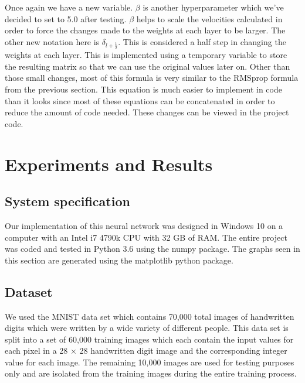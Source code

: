 \documentclass[12pt]{article}
\theoremstyle{definition}
\theoremstyle{plain}
\begin{document}
Once again we have a new variable. $\beta$ is another hyperparameter which we've decided to set to 5.0 after testing. $\beta$ helps to scale the velocities calculated in order to force the changes made to the weights at each layer to be larger. The other new notation here is $\delta_{l+\frac{1}{2}}$. This is considered a half step in changing the weights at each layer. This is implemented using a temporary variable to store the resulting matrix so that we can use the original values later on. Other than those small changes, most of this formula is very similar to the RMSprop formula from the previous section. This equation is much easier to implement in code than it looks since most of these equations can be concatenated in order to reduce the amount of code needed. These changes can be viewed in the project code.

\section{Experiments and Results}
\subsection{System specification}
Our implementation of this neural network was designed in Windows 10 on a computer with an Intel i7 4790k CPU with 32 GB of RAM. The entire project was coded and tested in Python 3.6 using the numpy package. The graphs seen in this section are generated using the matplotlib python package.

\subsection{Dataset}
We used the MNIST data set which contains 70,000 total images of handwritten digits which were written by a wide variety of different people. This data set is split into a set of 60,000 training images which each contain the input values for each pixel in a 28 $\times$ 28 handwritten digit image and the corresponding integer value for each image. The remaining 10,000 images are used for testing purposes only and are isolated from the training images during the entire training process\cite{mnist}.
\end{document}
